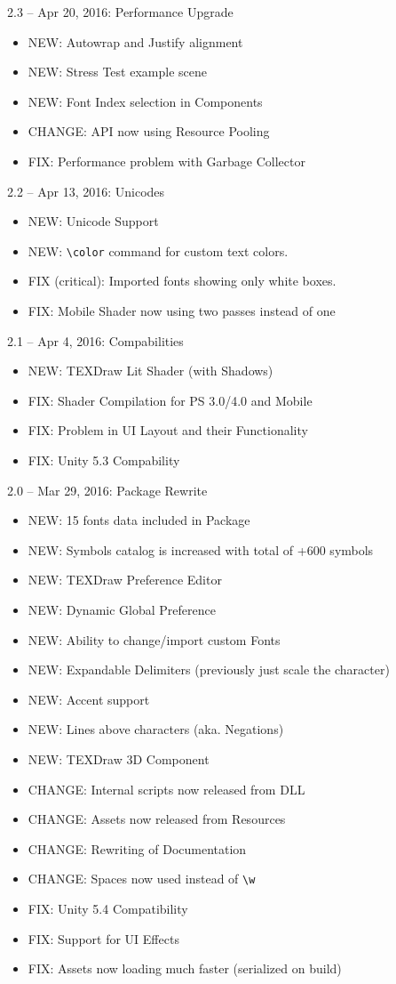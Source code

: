 \documentclass[12pt]{article}
\begin{document}
2.3 – Apr 20, 2016: Performance Upgrade
\begin{itemize}
\item NEW: Autowrap and Justify alignment
\item NEW: Stress Test example scene
\item NEW: Font Index selection in  Components
\item CHANGE: API now using Resource Pooling
\item FIX: Performance problem with Garbage Collector
\end{itemize}

2.2 – Apr 13, 2016: Unicodes
\begin{itemize}
\item NEW: Unicode Support
\item NEW: \verb|\color| command for custom text colors.
\item FIX (critical):  Imported fonts showing only white boxes.
\item FIX: Mobile Shader now using two passes instead of one
\end{itemize}

2.1 – Apr 4, 2016: Compabilities
\begin{itemize}
\item NEW: TEXDraw Lit Shader (with Shadows)
\item FIX: Shader Compilation for PS 3.0/4.0 and Mobile
\item FIX: Problem in UI Layout and their Functionality
\item FIX: Unity 5.3 Compability
\end{itemize}

2.0 – Mar 29, 2016: Package Rewrite
\begin{itemize}
\item NEW: 15 fonts data included in Package
\item NEW: Symbols catalog is increased with total of +600 symbols
\item NEW: TEXDraw Preference Editor
\item NEW: Dynamic Global Preference
\item NEW: Ability to change/import custom Fonts
\item NEW: Expandable Delimiters (previously just scale the character)
\item NEW: Accent support
\item NEW: Lines above characters (aka. Negations)
\item NEW: TEXDraw 3D Component
\item CHANGE: Internal scripts now released from DLL
\item CHANGE: Assets now released from Resources
\item CHANGE: Rewriting of Documentation
\item CHANGE: Spaces now used instead of \verb|\w|
\item FIX: Unity 5.4 Compatibility
\item FIX: Support for UI Effects
\item FIX: Assets now loading much faster (serialized on build)
\end{itemize}
\end{document}
